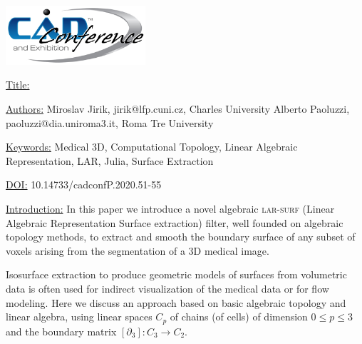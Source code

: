 \documentclass{article}
\begin{document}
{\centering  \includegraphics[width=5.173cm,height=2.193cm]{images/CADconverted-img001.jpg} \par}

\vspace{5pt}
\noindent
\underline{Title:}


\vspace{1em}
\noindent \underline{Authors:}
\newline
Miroslav Jirik, jirik@lfp.cuni.cz, Charles University\newline
Alberto Paoluzzi, paoluzzi@dia.uniroma3.it, Roma Tre University

\vspace{1em}
\noindent \underline{Keywords:}\newline
Medical 3D, Computational Topology, Linear Algebraic Representation, LAR, Julia, Surface Extraction


\bigskip


\noindent \underline{DOI:} 10.14733/cadconfP.2020.51-55

\vspace{10pt}
\noindent\underline{Introduction:}\vspace{0.2em}\newline
In this paper we introduce a novel algebraic \textsc{lar-surf} (Linear Algebraic Representation Surface extraction) filter, well founded on algebraic topology methods, to extract and smooth the boundary surface of any subset of voxels arising from the segmentation of a 3D medical image.

Isosurface extraction to produce geometric models of surfaces from volumetric data 
is often used for indirect visualization of the medical data or for flow modeling. %
Here we discuss an approach based on basic algebraic topology and linear algebra, using linear spaces $C_p$ of chains (of cells) of dimension $0 \leq p \leq 3$ and the boundary matrix $[\partial_3] : C_3 \to C_2$.
\end{document}
